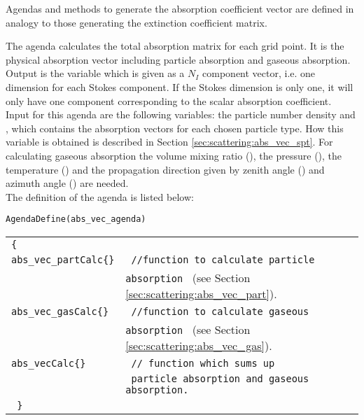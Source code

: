 \label{sec:scattering:abs_vec}

Agendas and methods to generate the absorption coefficient vector are
defined in analogy to those generating the extinction coefficient matrix.

\label{sec:scattering:abs_vec_agenda}

The agenda  calculates the total absorption
matrix \AbsVec{}
for each grid point. It is the physical absorption vector including
particle absorption and gaseous absorption.\\
Output is the variable  which is given
as a $N_I$ component vector, i.e. one dimension for each Stokes component. If the
Stokes dimension is only one, it will only have one component
corresponding to the scalar absorption coefficient. \\
Input for this agenda are the following variables:
the particle number density  and 
, which contains the absorption vectors  for
each chosen particle type. How this variable is obtained
is described in Section \ref{sec:scattering:abs_vec_spt}. For calculating 
gaseous absorption the volume mixing ratio (), the
pressure  (), the temperature  () and the
propagation direction given by zenith angle () and
azimuth angle () are needed.\\
The definition of the agenda is listed below:

\verb|AgendaDefine(abs_vec_agenda)|\\
\begin{tabular}[h]{l l}
\verb|{ |\\
\verb|abs_vec_partCalc{}| & \verb| //function to calculate particle |\\
& \verb|absorption | (see Section \ref{sec:scattering:abs_vec_part}).\\
\verb|abs_vec_gasCalc{}| & \verb| //function to calculate gaseous | \\
& \verb|absorption | (see Section \ref{sec:scattering:abs_vec_gas}).\\ 
\verb|abs_vecCalc{}| &\verb| // function which sums up | \\
& \verb| particle absorption and gaseous absorption.|\\
\verb| }|
\end{tabular}



